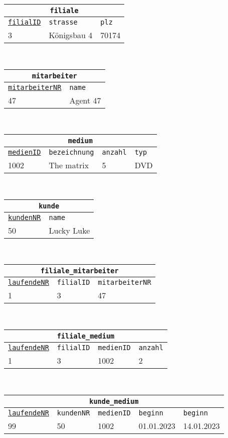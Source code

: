 \begin{Answer}[ref=TabelleErstellen1]
\begin{enumerate}
		\begin{tabular}{lll}
			\multicolumn{3}{c}{\lstinline!filiale!}\\
			\hline
			\underline{\lstinline!filialID!}&\lstinline!strasse!&\lstinline!plz!\\
			\hline
			3&Königsbau 4&70174\\
		\end{tabular}\\
		\begin{tabular}{ll}
			\multicolumn{2}{c}{\lstinline!mitarbeiter!}\\
			\hline
			\underline{\lstinline!mitarbeiterNR!}&\lstinline!name!\\
			\hline
			47&Agent 47\\
		\end{tabular}\\
		\begin{tabular}{llll}
			\multicolumn{4}{c}{\lstinline!medium!}\\
			\hline
			\underline{\lstinline!medienID!}&\lstinline!bezeichnung!&\lstinline!anzahl!&\lstinline!typ!\\
			\hline
			1002&The matrix&5&DVD\\
		\end{tabular}\\
		\begin{tabular}{ll}
			\multicolumn{2}{c}{\lstinline!kunde!}\\
			\hline
			\underline{\lstinline!kundenNR!}&\lstinline!name!\\
			\hline
			50&Lucky Luke\\
		\end{tabular}\\
		\begin{tabular}{lll}
			\multicolumn{3}{c}{\lstinline!filiale_mitarbeiter!}\\
			\hline
			\underline{\lstinline!laufendeNR!}&\lstinline!filialID!&\lstinline!mitarbeiterNR!\\
			\hline
			1&3&47\\
		\end{tabular}\\
		\begin{tabular}{llll}
			\multicolumn{4}{c}{\lstinline!filiale_medium!}\\
			\hline
			\underline{\lstinline!laufendeNR!}&\lstinline!filialID!&\lstinline!medienID!&\lstinline!anzahl!\\
			\hline
			1&3&1002&2\\
		\end{tabular}\\
		\begin{tabular}{lllll}
			\multicolumn{5}{c}{\lstinline!kunde_medium!}\\
			\hline
			\underline{\lstinline!laufendeNR!}&\lstinline!kundenNR!&\lstinline!medienID!&\lstinline!beginn!&\lstinline!beginn!\\
			\hline
			99&50&1002&01.01.2023&14.01.2023\\
		\end{tabular}
	\end{enumerate}
\end{Answer}